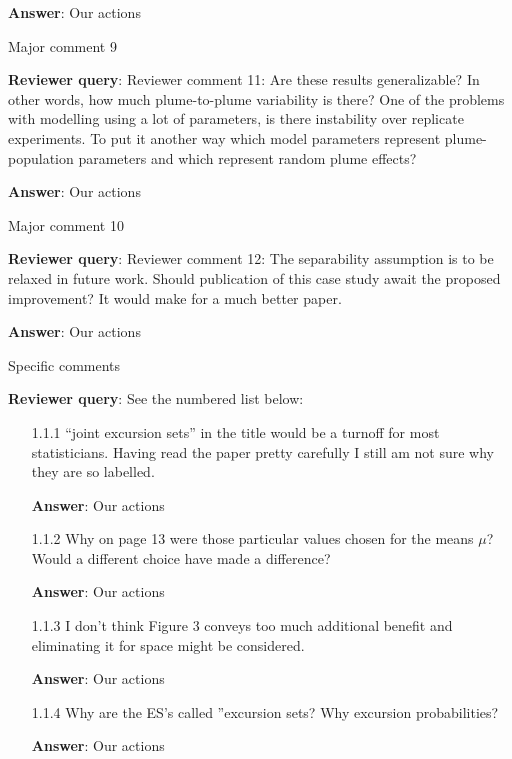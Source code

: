 \documentclass[a4paper]{article}
\def\reply{\textbf{Reviewer query}}
\def\action{\textbf{Answer}}
\begin{document}
\begin{answers}
\action: Our actions

\item{Major comment 9}\label{q9}

\reply: Reviewer comment 11: Are these results generalizable? In other words, how much plume-to-plume variability is there? One of the problems with modelling using a lot of parameters, is there instability over replicate experiments. To put it another way which model parameters represent plume-population parameters and which represent random plume effects?

\action: Our actions

\item{Major comment 10}\label{q10}

\reply: Reviewer comment 12: The separability assumption is to be relaxed in future work. Should publication of this case study await the proposed improvement? It would make for a much better paper.

\action: Our actions

\item{Specific comments}\label{q11}

\reply: See the numbered list below:
\begin{itemize}[noitemsep,topsep=0pt,parsep=0pt,partopsep=0pt]

\item[1.1.1] “joint excursion sets” in the title would be a turnoff for most statisticians. Having read the paper pretty carefully I still am not sure why they are so labelled.\par
\action: Our actions
\vspace{1em}

\item[1.1.2] Why on page 13 were those particular values chosen for the means $\mu$? Would a different choice have made a difference?\par
\action: Our actions
\vspace{1em}

\item[1.1.3] I don’t think Figure 3 conveys too much additional benefit and eliminating it for space might be considered.\par
\action: Our actions
\vspace{1em}

\item[1.1.4] Why are the ES’s called ”excursion sets? Why excursion probabilities?\par
\action: Our actions
\vspace{1em}


\end{itemize}
\end{answers}
\end{document}
